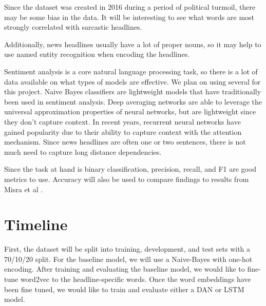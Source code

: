 \documentclass[11pt]{article}
\begin{document}
Since the dataset was created in 2016 during a period of political
turmoil, there may be some bias in the data. It will be interesting to see what
words are most strongly correlated with sarcastic headlines.

Additionally, news headlines usually have a lot of proper nouns, so it may
help to use named entity recognition when encoding the headlines.

Sentiment analysis is a core natural language processing task, so there is
a lot of data available on what types of models are effective. We plan on using
several for this project. Naive Bayes classifiers are lightweight models that
have traditionally been used in sentiment analysis. Deep averaging networks are
able to leverage the universal approximation properties of neural networks, but
are lightweight since they don't capture context. In recent years, recurrent
neural networks have gained popularity due to their ability to capture context
with the attention mechanism. Since news headlines are often one or two
sentences, there is not much need to capture long distance dependencies.

Since the task at hand is binary classification, precision, recall, and F1
are good metrics to use. Accuracy will also be used to compare findings to
results from Misra et al \cite{misra2023Sarcasm}.

\section{Timeline}
First, the dataset will be split into training, development, and test sets
with a 70/10/20 split.
For the baseline model,
we will use a Naive-Bayes with one-hot encoding.
After training and evaluating the baseline model,
we would like to fine-tune word2vec to the headline-specific words.
Once the word embeddings have been fine tuned,
we would like to train and evaluate either a
DAN or LSTM model.

\printbibliography
\end{document}
